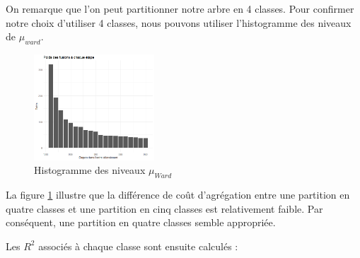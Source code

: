 \documentclass{article}
\begin{document}
On remarque que l'on peut partitionner notre arbre en 4 classes.
Pour confirmer notre choix d’utiliser 4 classes, nous pouvons utiliser l’histogramme des niveaux de $\mu_{ward}$.
\begin{figure}[H]
    \centering
    \includegraphics[width=0.4\textwidth]{histoward.png}
    \caption{Histogramme des niveaux $\mu_{Ward}$}
    \label{fig:HWard} 
\end{figure}

La figure \ref{fig:HWard} illustre que la différence de coût d'agrégation entre une partition en quatre classes et une partition en cinq classes est relativement faible. Par conséquent, une partition en quatre classes semble appropriée. 

Les \( R^2 \) associés à chaque classe sont ensuite calculés :
\end{document}
